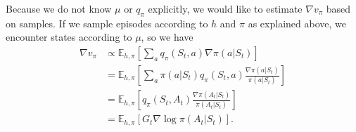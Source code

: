 \documentclass[a4paper]{report}
\theoremstyle{definition}
\theoremstyle{plain}
\begin{document}
%
Because we do not know $\mu$ or $q_{\pi}$ explicitly, we would like to estimate
$\nabla v_{\pi}$ based on samples. If we sample episodes according to $h$ and
$\pi$ as explained above, we encounter states according to $\mu$, so we have
\begin{subequations}
\begin{align}
  \nabla v_{\pi} &\propto \mathbb{E}_{h, \pi} \left[ \sum_{a} q_{\pi}(S_{t}, a) \nabla\pi(a | S_{t}) \right] \\
  &= \mathbb{E}_{h, \pi} \left[ \sum_{a} \pi(a | S_{t}) q_{\pi}(S_{t}, a) \frac{\nabla \pi(a | S_{t})}{\pi(a | S_{t})} \right] \\
  &= \mathbb{E}_{h, \pi} \left[ q_{\pi}(S_{t}, A_{t}) \frac{\nabla \pi(A_{t} | S_{t})}{\pi(A_{t}| S_{t})} \right] \\
  &= \mathbb{E}_{h, \pi} \left[ G_{t} \nabla \log \pi(A_{t} | S_{t}) \right] .
  \label{eq:estimator1}
\end{align}
\end{subequations}
\end{document}
